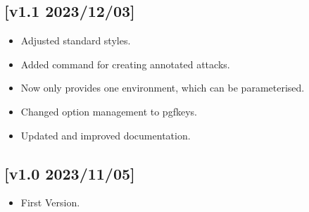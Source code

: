 \documentclass{article}
\begin{document}
\subsection*{[v1.1 2023/12/03]}
\begin{itemize}
    \item Adjusted standard styles.
    \item Added command for creating annotated attacks.
    \item Now only provides one environment, which can be parameterised.
    \item Changed option management to pgfkeys.
    \item Updated and improved documentation.
\end{itemize}

\subsection*{[v1.0 2023/11/05]}
\begin{itemize}
    \item First Version.
\end{itemize}
\end{document}
